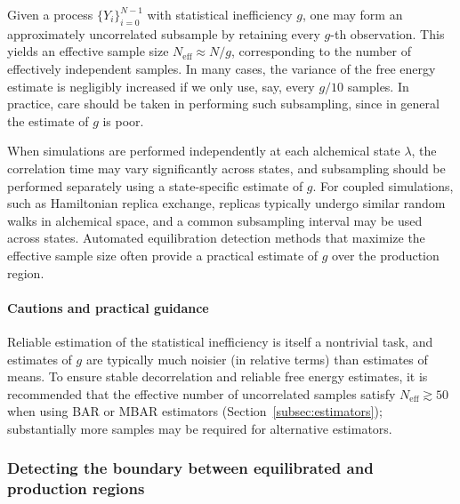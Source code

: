 Given a process $\{Y_i\}_{i=0}^{N-1}$ with statistical inefficiency $g$, one may form an approximately uncorrelated subsample by retaining every $g$-th observation. This yields an effective sample size $N_{\mathrm{eff}} \approx N / g$, corresponding to the number of effectively independent samples. In many cases, the variance of the free energy estimate is negligibly increased if we only use, say, every $g/10$ samples. In practice, care should be taken in performing such subsampling, since in general the estimate of $g$ is poor. 

When simulations are performed independently at each alchemical state $\lambda$, the correlation time may vary significantly across states, and subsampling should be performed separately using a state-specific estimate of $g$. For coupled simulations, such as Hamiltonian replica exchange, replicas typically undergo similar random walks in alchemical space, and a common subsampling interval may be used across states. Automated equilibration detection methods that maximize the effective sample size often provide a practical estimate of $g$ over the production region.

\paragraph{Cautions and practical guidance}

Reliable estimation of the statistical inefficiency is itself a nontrivial task, and estimates of $g$ are typically much noisier (in relative terms) than estimates of means. To ensure stable decorrelation and reliable free energy estimates, it is recommended that the effective number of uncorrelated samples satisfy $N_{\mathrm{eff}} \gtrsim 50$ when using BAR or MBAR estimators (Section~\ref{subsec:estimators}); substantially more samples may be required for alternative estimators.


\subsubsection{Detecting the boundary between equilibrated and production regions}

